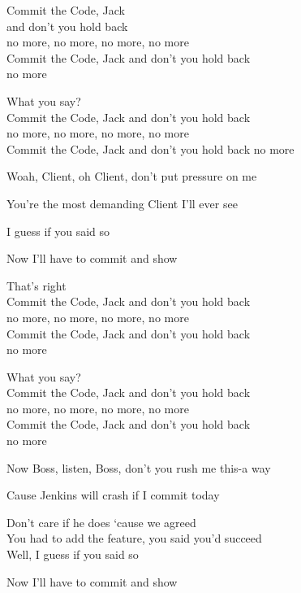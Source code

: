 \documentclass[11pt,a5paper]{article}
\begin{document}
				Commit the Code, Jack \\
				and don’t you hold back \\
                no more, no more, no more, no more \\
				Commit the Code, Jack and don’t you hold back \\ no more
                
				\hfill What you say? \\
				Commit the Code, Jack and don’t you hold back \\
                no more, no more, no more, no more \\
				Commit the Code, Jack and don’t you hold back no more
                
				\hfill Woah, Client, oh Client, don’t put pressure on me
                
				\hfill You’re the most demanding Client I’ll ever see
                
				\hfill I guess if you said so
                
				\hfill Now I’ll have to commit and show 
                
				That’s right \\
				Commit the Code, Jack and don’t you hold back \\
                no more, no more, no more, no more \\
				Commit the Code, Jack and don’t you hold back \\ no more
                
				\hfill What you say? \\
				Commit the Code, Jack and don’t you hold back \\
                no more, no more, no more, no more \\
				Commit the Code, Jack and don’t you hold back \\ no more
				
				\hfill Now Boss, listen, Boss, don’t you rush me this-a way
				
				\hfill Cause Jenkins will crash if I commit today
				
				Don’t care if he does ‘cause we agreed \\
				You had to add the feature, you said you’d succeed \\
				
				\hfill Well, I guess if you said so
				
				\hfill Now I’ll have to commit and show 
				
\end{document}
